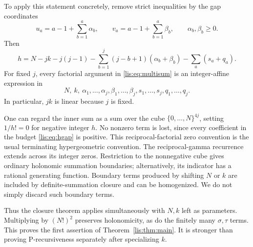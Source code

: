 \documentclass[11pt,letterpaper]{article}
\numberwithin{equation}{section}
\theoremstyle{definition}
\begin{document}
To apply this statement concretely, remove strict inequalities by the
gap coordinates
\begin{equation}
 u_a=a-1+\sum_{b=1}^{a}\alpha_b,
 \qquad v_a=a-1+\sum_{b=1}^{a}\beta_b,
 \qquad \alpha_b,\beta_b\ge0.
 \label{lis:eq:gaps}
\end{equation}
Then
\begin{equation}
 h=N-jk-j(j-1)-\sum_{b=1}^{j}(j-b+1)(\alpha_b+\beta_b)
                        -\sum_a(s_a+q_a).
 \label{lis:eq:hgap}
\end{equation}
For fixed $j$, every factorial argument in \eqref{lis:eq:multisum} is an
integer-affine expression in
\[
 N,\ k,\ \alpha_1,\ldots,\alpha_j,\beta_1,\ldots,\beta_j,
       s_1,\ldots,s_j,q_1,\ldots,q_j.
\]
In particular, $jk$ is linear because $j$ is fixed.

One can regard the inner sum as a sum over the cube $\{0,\ldots,N\}^{4j}$,
setting $1/h!=0$ for negative integer $h$. No nonzero term is lost,
since every coefficient in the budget \eqref{lis:eq:hgap} is positive.
This reciprocal-factorial zero convention is the usual terminating
hypergeometric convention. The reciprocal-gamma recurrence extends
across its integer zeros. Restriction to the nonnegative cube gives
ordinary holonomic summation boundaries; alternatively, its indicator
has a rational generating function. Boundary terms produced by shifting
$N$ or $k$ are included by definite-summation closure and can be
homogenized. We do not simply discard such boundary terms.

Thus the closure theorem applies simultaneously with $N,k$ left as
parameters. Multiplying by $(N!)^2$ preserves holonomicity, as do the
finitely many $\sigma,\tau$ terms. This proves the first assertion of
Theorem~\ref{lis:thm:main}. It is stronger than proving P-recursiveness
separately after specializing $k$.
\end{document}
